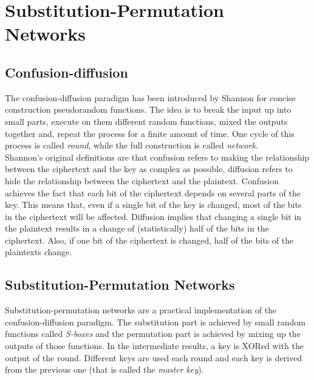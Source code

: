 \section{Substitution-Permutation Networks}
\subsection{Confusion-diffusion}
The confusion-diffusion paradigm has been introduced by Shannon for concise construction  pseudorandom functions. The idea is to break the input up into small parts, execute on them different random functions, mixed the outputs together and, repeat the process for a finite amount of time. One cycle of this process is called \emph{round}, while the full construction is called \emph{network}.\\
Shannon's original definitions are that confusion refers to making the relationship between the ciphertext and the key as complex as possible, diffusion refers to hide the relationship between the ciphertext and the plaintext.
Confusion achieves the fact that each bit of the ciphertext depends on several parts of the key. This means that, even if a single bit of the key is changed, most of the bits in the ciphertext will be affected.
Diffusion implies that changing a single bit in the plaintext results in a change of (statistically) half of the bits in the ciphertext. Also, if one bit of the ciphertext is changed, half of the bits of the plaintexts change.

\subsection{Substitution-Permutation Networks}
Substitution-permutation networks are a practical implementation of the confusion-diffusion paradigm. The substitution part is achieved by small random functions called \emph{S-boxes} and the permutation part is achieved by mixing up the outputs of those functions. In the intermediate results, a key is XORed with the output of the round. Different keys are used each round and each key is derived from the previous one (that is called the \emph{master key}).
